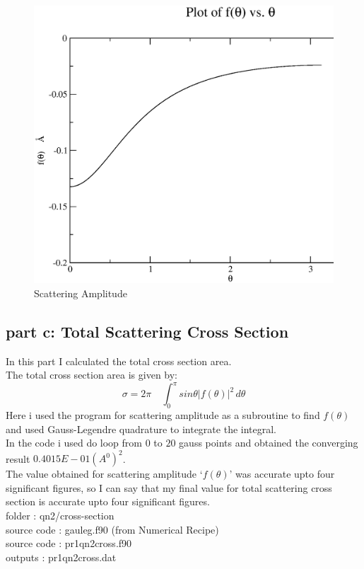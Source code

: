 \documentclass[11pt,a4paper,english]{article}
\newcommand{\bdm}{\begin{displaymath}}
\newcommand{\edm}{\end{displaymath}}
\begin{document}
	
	\begin{figure}[h!]
	\centering
	\includegraphics [scale=0.6]{pr1qn2amp.eps}
	\caption{Scattering Amplitude }
	\end{figure}
	\clearpage


	
	\subsection{part c: Total Scattering Cross Section}
In this part I calculated the total cross section area.\\
The total cross section area is given by:\\
\bdm
\sigma=2\pi \quad \int_0^\pi \!\!  sin\theta |f(\theta)|^{2}\, d\theta
\edm 
Here i used the program for scattering amplitude as a subroutine to find $f(\theta)$ and used Gauss-Legendre quadrature
to integrate the integral.\\
In the code i used do loop from $0$ to $20$ gauss points and 
obtained the converging result $0.4015E-01 (A^{0})^{2}$.\\
The value obtained for scattering amplitude `$f(\theta)$' was accurate upto four significant figures, so I can say that my final value for total scattering cross section is accurate upto four significant figures.\\
    folder       : qn2/cross-section\\
    source code  : gauleg.f90 (from Numerical Recipe) \\
	source code  : pr1qn2cross.f90\\
	outputs      : pr1qn2cross.dat\\ 
\end{document}
